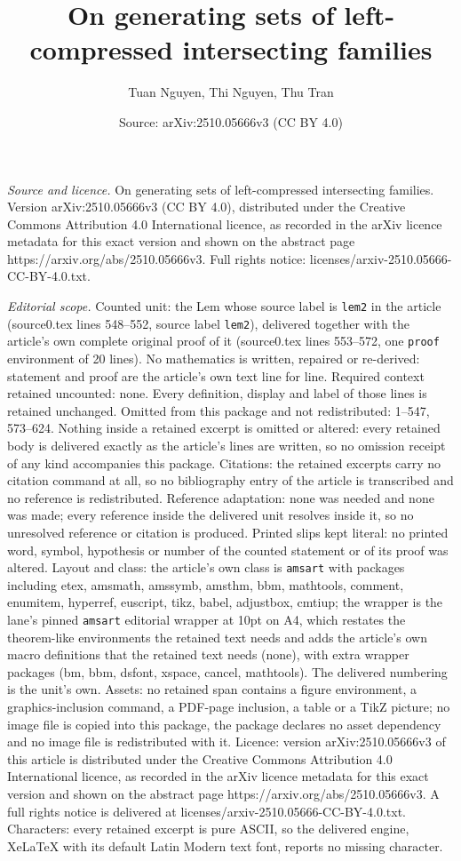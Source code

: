 \documentclass[10pt,a4paper]{amsart}
\title[On generating sets of left-compressed intersecting families]{On generating sets of left-compressed intersecting families}
\author{Tuan Nguyen, Thi Nguyen, Thu Tran}
\date{Source: arXiv:2510.05666v3 (CC BY 4.0)}
\begin{document}
\maketitle

\noindent\emph{Source and licence.} On generating sets of left-compressed intersecting families. Version arXiv:2510.05666v3 (CC BY 4.0), distributed under the Creative Commons Attribution 4.0 International licence, as recorded in the arXiv licence metadata for this exact version and shown on the abstract page https://arxiv.org/abs/2510.05666v3. Full rights notice: licenses/arxiv-2510.05666-CC-BY-4.0.txt.\par\smallskip

\noindent\textit{Editorial scope.} Counted unit: the Lem whose source label is \texttt{lem2} in the article (source0.tex lines 548--552, source label \texttt{lem2}), delivered together with the article's own complete original proof of it (source0.tex lines 553--572, one \texttt{proof} environment of 20 lines). No mathematics is written, repaired or re-derived: statement and proof are the article's own text line for line. Required context retained uncounted: none. Every definition, display and label of those lines is retained unchanged. Omitted from this package and not redistributed: 1--547, 573--624. Nothing inside a retained excerpt is omitted or altered: every retained body is delivered exactly as the article's lines are written, so no omission receipt of any kind accompanies this package. Citations: the retained excerpts carry no citation command at all, so no bibliography entry of the article is transcribed and no reference is redistributed. Reference adaptation: none was needed and none was made; every reference inside the delivered unit resolves inside it, so no unresolved reference or citation is produced. Printed slips kept literal: no printed word, symbol, hypothesis or number of the counted statement or of its proof was altered. Layout and class: the article's own class is \texttt{amsart} with packages including etex, amsmath, amssymb, amsthm, bbm, mathtools, comment, enumitem, hyperref, euscript, tikz, babel, adjustbox, cmtiup; the wrapper is the lane's pinned \texttt{amsart} editorial wrapper at 10pt on A4, which restates the theorem-like environments the retained text needs and adds the article's own macro definitions that the retained text needs (none), with extra wrapper packages (bm, bbm, dsfont, xspace, cancel, mathtools). The delivered numbering is the unit's own. Assets: no retained span contains a figure environment, a graphics-inclusion command, a PDF-page inclusion, a table or a TikZ picture; no image file is copied into this package, the package declares no asset dependency and no image file is redistributed with it. Licence: version arXiv:2510.05666v3 of this article is distributed under the Creative Commons Attribution 4.0 International licence, as recorded in the arXiv licence metadata for this exact version and shown on the abstract page https://arxiv.org/abs/2510.05666v3. A full rights notice is delivered at licenses/arxiv-2510.05666-CC-BY-4.0.txt. Characters: every retained excerpt is pure ASCII, so the delivered engine, XeLaTeX with its default Latin Modern text font, reports no missing character.
\end{document}
